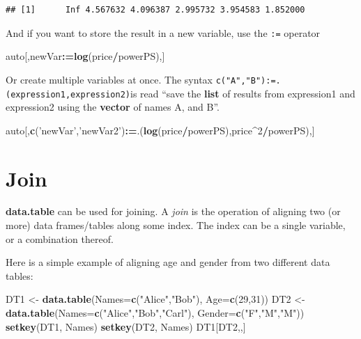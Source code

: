 \documentclass[]{book}
\newenvironment{Shaded}{\begin{snugshade}}{\end{snugshade}}
\newcommand{\KeywordTok}[1]{\textcolor[rgb]{0.13,0.29,0.53}{\textbf{#1}}}
\newcommand{\DataTypeTok}[1]{\textcolor[rgb]{0.13,0.29,0.53}{#1}}
\newcommand{\DecValTok}[1]{\textcolor[rgb]{0.00,0.00,0.81}{#1}}
\newcommand{\StringTok}[1]{\textcolor[rgb]{0.31,0.60,0.02}{#1}}
\newcommand{\OperatorTok}[1]{\textcolor[rgb]{0.81,0.36,0.00}{\textbf{#1}}}
\newcommand{\ErrorTok}[1]{\textcolor[rgb]{0.64,0.00,0.00}{\textbf{#1}}}
\newcommand{\NormalTok}[1]{#1}
\theoremstyle{definition}
\theoremstyle{definition}
\theoremstyle{definition}
\theoremstyle{remark}
\begin{document}
\begin{verbatim}
## [1]      Inf 4.567632 4.096387 2.995732 3.954583 1.852000
\end{verbatim}

And if you want to store the result in a new variable, use the
\texttt{:=} operator

\begin{Shaded}
\begin{Highlighting}[]
\NormalTok{auto[,newVar}\OperatorTok{:}\ErrorTok{=}\KeywordTok{log}\NormalTok{(price}\OperatorTok{/}\NormalTok{powerPS),]}
\end{Highlighting}
\end{Shaded}

Or create multiple variables at once. The syntax
\texttt{c("A","B"):=.(expression1,expression2)}is read ``save the
\textbf{list} of results from expression1 and expression2 using the
\textbf{vector} of names A, and B''.

\begin{Shaded}
\begin{Highlighting}[]
\NormalTok{auto[,}\KeywordTok{c}\NormalTok{(}\StringTok{'newVar'}\NormalTok{,}\StringTok{'newVar2'}\NormalTok{)}\OperatorTok{:}\ErrorTok{=}\NormalTok{.(}\KeywordTok{log}\NormalTok{(price}\OperatorTok{/}\NormalTok{powerPS),price}\OperatorTok{^}\DecValTok{2}\OperatorTok{/}\NormalTok{powerPS),]}
\end{Highlighting}
\end{Shaded}

\section{Join}\label{join}

\textbf{data.table} can be used for joining. A \emph{join} is the
operation of aligning two (or more) data frames/tables along some index.
The index can be a single variable, or a combination thereof.

Here is a simple example of aligning age and gender from two different
data tables:

\begin{Shaded}
\begin{Highlighting}[]
\NormalTok{DT1 <-}\StringTok{ }\KeywordTok{data.table}\NormalTok{(}\DataTypeTok{Names=}\KeywordTok{c}\NormalTok{(}\StringTok{"Alice"}\NormalTok{,}\StringTok{"Bob"}\NormalTok{), }\DataTypeTok{Age=}\KeywordTok{c}\NormalTok{(}\DecValTok{29}\NormalTok{,}\DecValTok{31}\NormalTok{))}
\NormalTok{DT2 <-}\StringTok{ }\KeywordTok{data.table}\NormalTok{(}\DataTypeTok{Names=}\KeywordTok{c}\NormalTok{(}\StringTok{"Alice"}\NormalTok{,}\StringTok{"Bob"}\NormalTok{,}\StringTok{"Carl"}\NormalTok{), }\DataTypeTok{Gender=}\KeywordTok{c}\NormalTok{(}\StringTok{"F"}\NormalTok{,}\StringTok{"M"}\NormalTok{,}\StringTok{"M"}\NormalTok{))}
\KeywordTok{setkey}\NormalTok{(DT1, Names)}
\KeywordTok{setkey}\NormalTok{(DT2, Names)}
\NormalTok{DT1[DT2,,] }
\end{Highlighting}
\end{Shaded}
\end{document}

